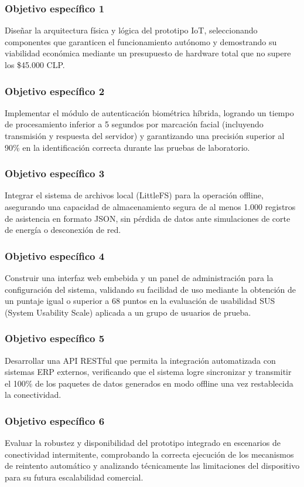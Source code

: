 \documentclass{iccmemoria}
\begin{document}
\subsubsection{Objetivo específico 1}
Diseñar la arquitectura física y lógica del prototipo IoT, seleccionando componentes que garanticen el funcionamiento autónomo y demostrando su viabilidad económica mediante un presupuesto de hardware total que no supere los \$45.000 CLP.

\subsubsection{Objetivo específico 2}
Implementar el módulo de autenticación biométrica híbrida, logrando un tiempo de procesamiento inferior a 5 segundos por marcación facial (incluyendo transmisión y respuesta del servidor) y garantizando una precisión superior al 90\% en la identificación correcta durante las pruebas de laboratorio.

\subsubsection{Objetivo específico 3}
Integrar el sistema de archivos local (LittleFS) para la operación offline, asegurando una capacidad de almacenamiento segura de al menos 1.000 registros de asistencia en formato JSON, sin pérdida de datos ante simulaciones de corte de energía o desconexión de red.

\subsubsection{Objetivo específico 4}
Construir una interfaz web embebida y un panel de administración para la configuración del sistema, validando su facilidad de uso mediante la obtención de un puntaje igual o superior a 68 puntos en la evaluación de usabilidad SUS (System Usability Scale) aplicada a un grupo de usuarios de prueba.

\subsubsection{Objetivo específico 5}
Desarrollar una API RESTful que permita la integración automatizada con sistemas ERP externos, verificando que el sistema logre sincronizar y transmitir el 100\% de los paquetes de datos generados en modo offline una vez restablecida la conectividad.

\subsubsection{Objetivo específico 6}
Evaluar la robustez y disponibilidad del prototipo integrado en escenarios de conectividad intermitente, comprobando la correcta ejecución de los mecanismos de reintento automático y analizando técnicamente las limitaciones del dispositivo para su futura escalabilidad comercial.
\end{document}
